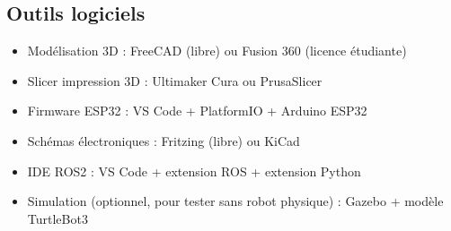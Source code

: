 \documentclass[12pt,a4paper]{article}
\begin{document}
\subsection*{Outils logiciels}

\begin{itemize}
  \item Modélisation 3D : FreeCAD (libre) ou Fusion 360 (licence étudiante)
  \item Slicer impression 3D : Ultimaker Cura ou PrusaSlicer
  \item Firmware ESP32 : VS Code + PlatformIO + Arduino ESP32
  \item Schémas électroniques : Fritzing (libre) ou KiCad
  \item IDE ROS2 : VS Code + extension ROS + extension Python
  \item Simulation (optionnel, pour tester sans robot physique) : Gazebo + modèle TurtleBot3
\end{itemize}
\end{document}
